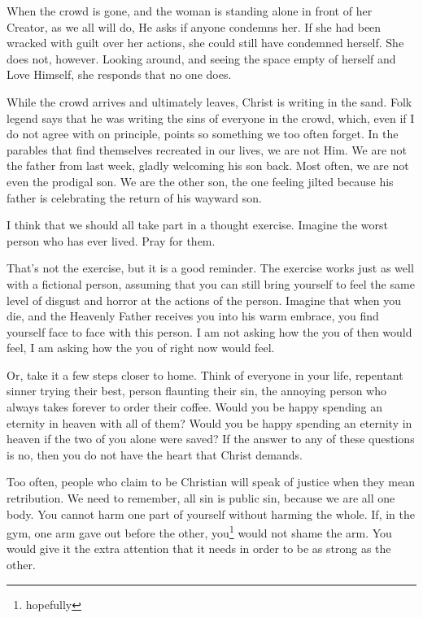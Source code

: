 \documentclass[12pt]{article}[titlepage]
\renewcommand{\,}{\textsuperscript{,}}
\begin{document}
When the crowd is gone, and the woman is standing alone in front of her Creator, as we all will do, He asks if anyone condemns her.  
If she had been wracked with guilt over her actions, she could still have condemned herself.  
She does not, however.  
Looking around, and seeing the space empty of herself and Love Himself, she responds that no one does.

While the crowd arrives and ultimately leaves, Christ is writing in the sand.  
Folk legend says that he was writing the sins of everyone in the crowd, which, even if I do not agree with on principle, points so something we too often forget.  
In the parables that find themselves recreated in our lives, we are not Him.  
We are not the father from last week, gladly welcoming his son back.  
Most often, we are not even the prodigal son.  
We are the other son, the one feeling jilted because his father is celebrating the return of his wayward son.

I think that we should all take part in a thought exercise.  
Imagine the worst person who has ever lived.  
Pray for them.

That's not the exercise, but it is a good reminder.  
The exercise works just as well with a fictional person, assuming that you can still bring yourself to feel the same level of disgust and horror at the actions of the person.  
Imagine that when you die, and the Heavenly Father receives you into his warm embrace, you find yourself face to face with this person.  
I am not asking how the you of then would feel, I am asking how the you of right now would feel.

Or, take it a few steps closer to home.  
Think of everyone in your life, repentant sinner trying their best, person flaunting their sin, the annoying person who always takes forever to order their coffee.  
Would you be happy spending an eternity in heaven with all of them?  
Would you be happy spending an eternity in heaven if the two of you alone were saved?  
If the answer to any of these questions is no, then you do not have the heart that Christ demands.

Too often, people who claim to be Christian will speak of justice when they mean retribution.  
We need to remember, all sin is public sin, because we are all one body.  
You cannot harm one part of yourself without harming the whole.  
If, in the gym, one arm gave out before the other, you\footnote{hopefully} would not shame the arm.  
You would give it the extra attention that it needs in order to be as strong as the other.
\end{document}
